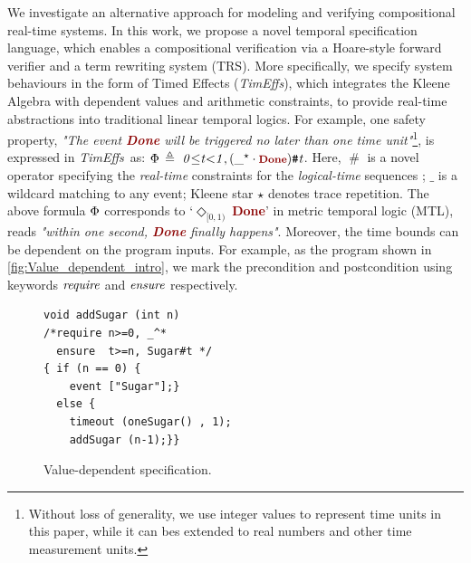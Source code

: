 \documentclass[acmsmall,10pt,review]{acmart}
\newcommand{\timedEffects}{\emph{TimEffs}}
\newcommand{\effect}{\textcolor{black}{\ensuremath{\mathrm{\Phi}}}}
\newcommand{\anyevent}[1]{{\textcolor{darkred}
{{\textbf{\footnotesize #1}}}}}
\newcommand{\code}[1]{{\tt{\ensuremath{\m{#1}}}}}
\newcommand{\m}{\mathit}
\newcommand{\mysharp}{{\mathrel{\texttt{\#}}}}
\def\defeq{\ensuremath{\,\triangleq}}
\begin{document}
We investigate an alternative approach for modeling and verifying 
compositional real-time systems. In this work, 
we propose a novel temporal specification language, 
which enables a compositional verification via a  Hoare-style 
forward verifier and a term rewriting system (TRS). 
More specifically, we specify system behaviours in the form of 
{Timed Effects} (\timedEffects), which integrates the Kleene Algebra with dependent values and arithmetic constraints, 
to 
provide real-time abstractions into traditional linear temporal logics. 
For example, one safety property, \textit{"The event \anyevent{Done} 
will be triggered no later than one time unit"}\footnote{Without loss of generality, 
we use integer values to represent time units in this 
paper, while it can bes extended to real numbers and other 
time measurement units.}, is expressed in \timedEffects\ as: 
\code{\effect \defeq \  0 {\leq} t {<}1, ({\_^\star} \cdot \anyevent{Done} ) \mysharp  t}.
Here, \code{\mysharp } is a novel operator specifying the \emph{real-time} 
constraints for the \emph{logical-time} sequences \cite{von2017real}; 
\code{\_} is a wildcard matching to any event; 
Kleene star \code{\star} denotes trace repetition.
The above formula \code{\effect} corresponds to `\code{\Diamond_{[0, 1)}\ }\anyevent{Done}' 
in metric temporal logic (MTL), reads \textit{"within one second, 
\anyevent{Done} finally happens"}. Moreover, the time bounds 
can be dependent on the program inputs. For example, as the program 
shown in \autoref{fig:Value_dependent_intro}, we mark the precondition and postcondition
using keywords \code{\emph{require}} and \code{\emph{ensure}} respectively. 

\newcommand{\codem}[1]{{\code{\emph{#1}}}}

\begin{figure}
  \vspace{-2mm}
\begin{lstlisting}
void addSugar (int n) 
/*require n>=0, _^*
  ensure  t>=n, Sugar#t */
{ if (n == 0) { 
    event ["Sugar"];} 
  else {
    timeout (oneSugar() , 1);
    addSugar (n-1);}} 
\end{lstlisting}
\vspace{-1mm}
\caption{Value-dependent specification.} 
\label{fig:Value_dependent_intro}
\vspace{-1mm}
\end{figure}
\end{document}
